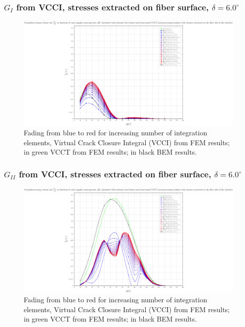 \begin{frame}
\frametitle{\small $G_{I}$ from VCCI, stresses extracted on fiber surface, $\delta=6.0^{\circ}$}
\vspace{-0.5cm}
\centering
\captionsetup[figure]{font=scriptsize,labelfont=scriptsize}
\begin{figure}[!h]
\centering
\includegraphics[height=0.7\textheight]{2017-07-25_AbqRunSummary_SmallStrain_D06/pdf/2017-07-25_AbqRunSummary_SmallStrain_D06_F-SoF-VCCT_GI.pdf}
  \caption{\scriptsize Fading from blue to red for increasing number of integration elements, Virtual Crack Closure Integral (VCCI) from FEM results; in green VCCT from FEM results; in black BEM results.}
  \label{fig:res1}
\end{figure}
\end{frame}
\begin{frame}
\frametitle{\small $G_{II}$ from VCCI, stresses extracted on fiber surface, $\delta=6.0^{\circ}$}
\vspace{-0.5cm}
\centering
\captionsetup[figure]{font=scriptsize,labelfont=scriptsize}
\begin{figure}[!h]
\centering
\includegraphics[height=0.7\textheight]{2017-07-25_AbqRunSummary_SmallStrain_D06/pdf/2017-07-25_AbqRunSummary_SmallStrain_D06_F-SoF-VCCT_GII.pdf}
  \caption{\scriptsize Fading from blue to red for increasing number of integration elements, Virtual Crack Closure Integral (VCCI) from FEM results; in green VCCT from FEM results; in black BEM results.}
  \label{fig:res1}
\end{figure}
\end{frame}
